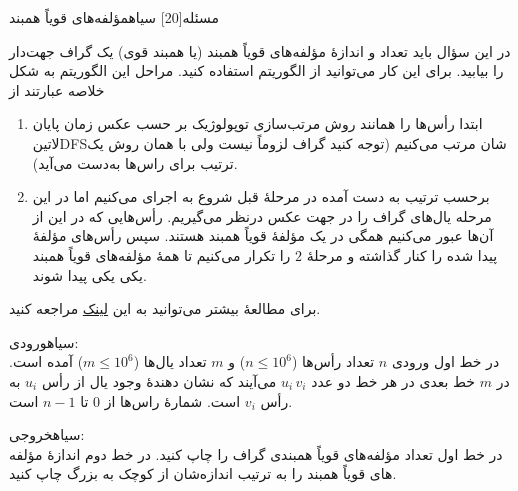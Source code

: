 ‌مسئله[20]
‌سیاه{مؤلفه‌های قویاً همبند}

در این سؤال باید تعداد و اندازۀ مؤلفه‌های قویاً همبند (یا همبند قوی) یک گراف جهت‌دار را بیابید. برای این کار می‌توانید از الگوریتم  استفاده کنید. مراحل این الگوریتم به شکل خلاصه عبارتند از 
\begin{enumerate}[1. ]
	\item
ابتدا رأس‌ها را همانند روش مرتب‌سازی توپولوژیک بر حسب عکس زمان پایان ‌لاتین{DFS}شان مرتب می‌کنیم (توجه کنید گراف لزوماً  نیست ولی با همان روش یک ترتیب برای راس‌ها به‌دست می‌آید).
	\item
برحسب ترتیب به دست آمده در مرحلۀ قبل شروع به اجرای
می‌کنیم اما در این مرحله یال‌های گراف را در جهت عکس درنظر می‌گیریم. رأس‌هایی که در این 
از آن‌ها عبور می‌کنیم همگی در یک مؤلفۀ قویاً همبند هستند. سپس رأس‌های مؤلفۀ پیدا شده را کنار گذاشته و مرحلۀ $2$ را تکرار می‌کنیم تا همۀ مؤلفه‌های قویاً همبند یکی یکی پیدا شوند.
\end{enumerate}

برای مطالعۀ بیشتر می‌توانید به این
\href{https://www.geeksforgeeks.org/strongly-connected-components}{لینک}
مراجعه کنید.

‌سیاه{ورودی:}\\
در خط اول ورودی $n$ تعداد رأس‌ها ($n \leq 10^6$) و $m$ تعداد یال‌ها ($m \leq 10^6$) آمده است.
در $m$ خط بعدی در هر خط دو عدد $u_i\, v_i$ می‌آیند که نشان دهندۀ وجود یال از رأس $u_i$ به رأس $v_i$ است.
شمارۀ راس‌ها از $0$ تا $n-1$ است.

‌سیاه{خروجی:}\\
در خط اول تعداد مؤلفه‌های قویاً همبندی گراف را چاپ کنید.
در خط دوم اندازۀ مؤلفه های قویاً همبند را به ترتیب اندازه‌شان از کوچک به بزرگ چاپ کنید.







